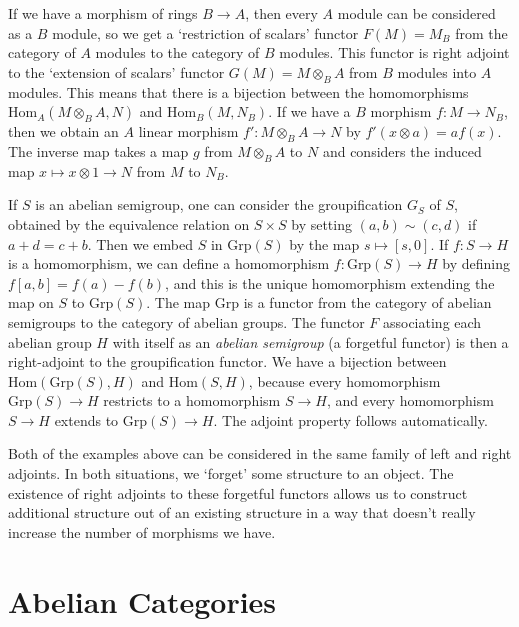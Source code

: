 \begin{example}
    If we have a morphism of rings $B \to A$, then every $A$ module can be considered as a $B$ module, so we get a `restriction of scalars' functor $F(M) = M_B$ from the category of $A$ modules to the category of $B$ modules. This functor is right adjoint to the `extension of scalars' functor $G(M) = M \otimes_B A$ from $B$ modules into $A$ modules. This means that there is a bijection between the homomorphisms $\text{Hom}_A(M \otimes_B A, N)$ and $\text{Hom}_B(M,N_B)$. If we have a $B$ morphism $f: M \to N_B$, then we obtain an $A$ linear morphism $f': M \otimes_B A \to N$ by $f'(x \otimes a) = af(x)$. The inverse map takes a map $g$ from $M \otimes_B A$ to $N$ and considers the induced map $x \mapsto x \otimes 1 \to N$ from $M$ to $N_B$.
\end{example}

\begin{example}
    If $S$ is an abelian semigroup, one can consider the groupification $G_S$ of $S$, obtained by the equivalence relation on $S \times S$ by setting $(a,b) \sim (c,d)$ if $a + d = c + b$. Then we embed $S$ in $\text{Grp}(S)$ by the map $s \mapsto [s,0]$. If $f: S \to H$ is a homomorphism, we can define a homomorphism $f: \text{Grp}(S) \to H$ by defining $f[a,b] = f(a) - f(b)$, and this is the unique homomorphism extending the map on $S$ to $\text{Grp}(S)$. The map $\text{Grp}$ is a functor from the category of abelian semigroups to the category of abelian groups. The functor $F$ associating each abelian group $H$ with itself as an {\it abelian semigroup} (a forgetful functor) is then a right-adjoint to the groupification functor. We have a bijection between $\text{Hom}(\text{Grp}(S),H)$ and $\text{Hom}(S,H)$, because every homomorphism $\text{Grp}(S) \to H$ restricts to a homomorphism $S \to H$, and every homomorphism $S \to H$ extends to $\text{Grp}(S) \to H$. The adjoint property follows automatically.
\end{example}

Both of the examples above can be considered in the same family of left and right adjoints. In both situations, we `forget' some structure to an object. The existence of right adjoints to these forgetful functors allows us to construct additional structure out of an existing structure in a way that doesn't really increase the number of morphisms we have.

\chapter{Abelian Categories}

